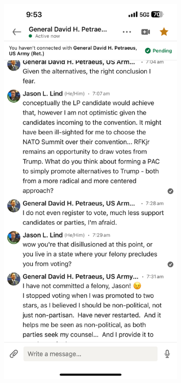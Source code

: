 \documentclass{article}
\begin{document}
\begin{figure}[h] %
    \centering %
    \includegraphics[width=0.8\textwidth]{msg1.jpeg} %
\end{figure}
\end{document}
